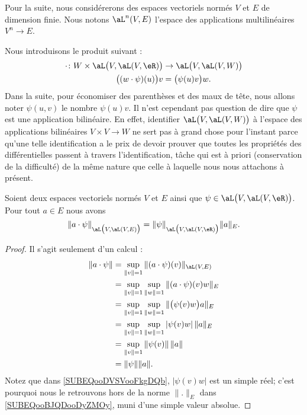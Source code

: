 Pour la suite, nous considérerons des espaces vectoriels normés \( V\) et \( E\) de dimension finie. Nous notons \( \aL^n(V,E)\) l'espace des applications multilinéaires \( V^n\to E\).

Nous introduisons le produit suivant\cite{MonCerveau} :
\begin{equation}
    \begin{aligned}
        \cdot\colon W\times \aL\big( V,\aL(V,\eR) \big)   &\to \aL\big( V,\aL(V,W) \big) \\
        \big( (w\cdot \psi)(u) \big)v&=\big( \psi(u)v \big)w. 
    \end{aligned}
\end{equation}
Dans la suite, pour économiser des parenthèses et des maux de tête, nous allons noter \( \psi(u,v)\) le nombre \( \psi(u)v\). Il n'est cependant pas question de dire que \( \psi\) est une application bilinéaire. En effet, identifier \( \aL\big( V,\aL(V,W) \big)\) à l'espace des applications bilinéaires \( V\times V\to W\) ne sert pas à grand chose pour l'instant parce qu'une telle identification a le prix de devoir prouver que toutes les propriétés des différentielles passent à travers l'identification, tâche qui est à priori (conservation de la difficulté) de la même nature que celle à laquelle nous nous attachons à présent.

\begin{lemma}        \label{LEMooHCUSooXYHuBR}
    Soient deux espaces vectoriels normés \( V\) et \( E\) ainsi que \( \psi\in\aL\big( V,\aL(V,\eR) \big)\). Pour tout \( a\in E\) nous avons
    \begin{equation}
        \| a\cdot \psi \|_{\aL\big( V,\aL(V,E) \big)}= \| \psi \|_{\aL\big( V,\aL(V,\eR) \big)}\| a \|_E.
    \end{equation}
\end{lemma}

\begin{proof}
    Il s'agit seulement d'un calcul :
    \begin{subequations}
        \begin{align}
            \| a\cdot \psi \|&=\sup_{\| v \|=1}\| (a\cdot \psi)(v) \|_{\aL(V,E)}\\
            &=\sup_{\| v \|=1}\sup_{\| w \|=1}\| (a\cdot\psi)(v)w \|_E\\
            &=\sup_{\| v \|=1}\sup_{\| w \|=1}\| \big( \psi(v)w \big)a \|_E  \label{SUBEQooDVSVooFkgDQb}   \\
            &=\sup_{\| v \|=1}\sup_{\| w \|=1}| \psi(v)w |\,\| a \|_{E} \label{SUBEQooBJQDooDyZMOy}   \\
            &=\sup_{\| v \|=1}\| \psi(v) \|\,\| a \|\\
            &=\| \psi \|\| a \|.
        \end{align}
    \end{subequations}
    Notez que dans \eqref{SUBEQooDVSVooFkgDQb}, \( | \psi(v)w |\) est un simple réel; c'est pourquoi nous le retrouvons hors de la norme \( \| . \|_E\) dans \eqref{SUBEQooBJQDooDyZMOy}, muni d'une simple valeur absolue.
\end{proof}

